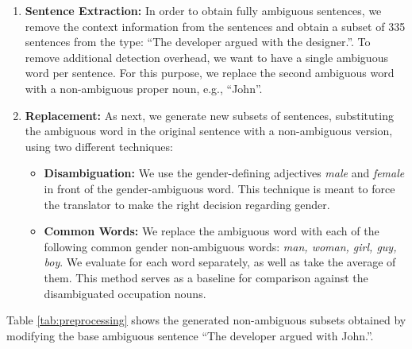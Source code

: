 \begin{enumerate}
  \item \textbf{Sentence Extraction:}  
  In order to obtain fully ambiguous sentences, we remove the context information from the sentences and obtain a subset of 335 sentences from the type: “The developer argued with the designer.”.
  To remove additional detection overhead, we want to have a single ambiguous word per sentence. For this purpose, we replace the second ambiguous word with a non-ambiguous proper noun, e.g., “John”. 
  \item \textbf{Replacement:} As next, we generate new subsets of sentences, substituting the ambiguous word in the original sentence with a non-ambiguous version, using two different techniques:
  \begin{itemize}
      \item \textbf{Disambiguation:} We use the gender-defining adjectives \textit{male} and \textit{female} in front of the gender-ambiguous word. This technique is meant to force the translator to make the right decision regarding gender. %
      \item \textbf{Common Words:} We replace the ambiguous word with each of the following common gender non-ambiguous words: \textit{man, woman, girl, guy, boy}. We evaluate for each word separately, as well as take the average of them. This method serves as a baseline for comparison against the disambiguated occupation nouns.
  \end{itemize}
\end{enumerate}

Table \ref{tab:preprocessing} shows the generated non-ambiguous subsets obtained by modifying the base ambiguous sentence “The developer argued with John.”.

